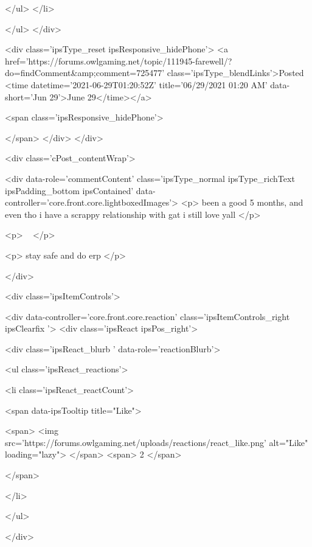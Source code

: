 							
							
							
							
						
					</ul>
				</li>
				
			</ul>
		</div>

		<div class='ipsType_reset ipsResponsive_hidePhone'>
			<a href='https://forums.owlgaming.net/topic/111945-farewell/?do=findComment&amp;comment=725477' class='ipsType_blendLinks'>Posted <time datetime='2021-06-29T01:20:52Z' title='06/29/2021 01:20  AM' data-short='Jun 29'>June 29</time></a> 
			
			<span class='ipsResponsive_hidePhone'>
				
				
			</span>
		</div>
	</div>

	

    

	<div class='cPost_contentWrap'>
		
		<div data-role='commentContent' class='ipsType_normal ipsType_richText ipsPadding_bottom ipsContained' data-controller='core.front.core.lightboxedImages'>
			<p>
	been a good 5 months, and even tho i have a scrappy relationship with gat i still love yall
</p>

<p>
	 
</p>

<p>
	stay safe and do erp
</p>


			
		</div>

		
			<div class='ipsItemControls'>
				
					
						

	<div data-controller='core.front.core.reaction' class='ipsItemControls_right ipsClearfix '>	
		<div class='ipsReact ipsPos_right'>
			
				
				<div class='ipsReact_blurb ' data-role='reactionBlurb'>
					
						

	
	<ul class='ipsReact_reactions'>
		
		
			
				
				<li class='ipsReact_reactCount'>
					
						<span data-ipsTooltip title="Like">
					
							<span>
								<img src='https://forums.owlgaming.net/uploads/reactions/react_like.png' alt="Like" loading="lazy">
							</span>
							<span>
								2
							</span>
					
						</span>
					
				</li>
			
		
	</ul>

					
				</div>
			
